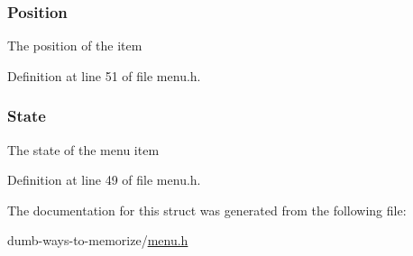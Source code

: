 \subsubsection[{\texorpdfstring{Position}{Position}}]{ Position}\hypertarget{structmenu__item__s_ae69b5c22d5cd3911965dc992d40ba4fc}{}\label{structmenu__item__s_ae69b5c22d5cd3911965dc992d40ba4fc}
The position of the item 

Definition at line 51 of file menu.\+h.

\subsubsection[{\texorpdfstring{State}{State}}]{ State}\hypertarget{structmenu__item__s_a549a5400c9f9b61bb66d0239bd21fe53}{}\label{structmenu__item__s_a549a5400c9f9b61bb66d0239bd21fe53}
The state of the menu item 

Definition at line 49 of file menu.\+h.



The documentation for this struct was generated from the following file\+:\begin{DoxyCompactItemize}
\item 
dumb-\/ways-\/to-\/memorize/\hyperlink{menu_8h}{menu.\+h}\end{DoxyCompactItemize}
